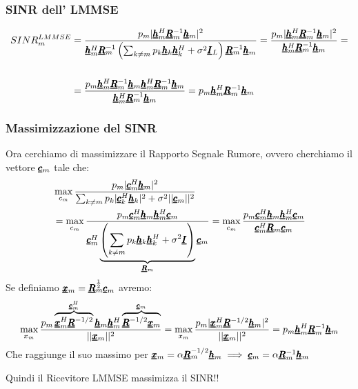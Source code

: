 \subsubsection{SINR dell' LMMSE}
\begin{equation*}
\begin{aligned}
     SINR_m^{LMMSE} &= \frac{p_m |\vc{h}_m^H \vc{R}_m^{-1} \vc{h}_m|^2}{\vc{h}_m^H \vc{R}_m^{-1} \left(\sum_{k \neq m} p_k \vc{h}_k \vc{h}_k^H + \sigma^2 \vc{I}_L \right)\vc{R}_m^{-1} \vc{h}_m } = \frac{p_m |\vc{h}_m^H \vc{R}_m^{-1} \vc{h}_m|^2}{\vc{h}_m^H \vc{R}_m^{-1} \vc{h}_m} = \\ \\
     &= \frac{p_m \vc{h}_m^H \vc{R}_m^{-1} \vc{h}_m \vc{h}_m^H \vc{R}_m^{-1} \vc{h}_m}{\vc{h}_m^H \vc{R}_m^{-1} \vc{h}_m} = p_m \vc{h}_m^H \vc{R}_m^{-1} \vc{h}_m 
\end{aligned}
\end{equation*}


\subsubsection{Massimizzazione del SINR}
Ora cerchiamo di massimizzare il Rapporto Segnale Rumore, ovvero cherchiamo il vettore $\vc{c}_m$ tale che:
\begin{equation*}
\begin{aligned}
    &\max_{c_m} \frac{p_m |\vc{c}_m^H \vc{h}_m|^2}{\sum_{k \neq m} p_k |\vc{c}_k^H \vc{h}_k|^2 +\sigma^2 ||\vc{c}_m||^2} \\
    &= \max_{c_m} \frac{p_m \vc{c}_m^H \vc{h}_m \vc{h}_m^H \vc{c}_m}{\vc{c}_m^H \underbrace{\left(\sum_{k \neq m} p_k \vc{h}_k \vc{h}_k^H  +\sigma^2 \vc{I}\right)}_{\vc{R}_m}\vc{c}_m} = \max_{c_m} \frac{p_m \vc{c}_m^H \vc{h}_m \vc{h}_m^H \vc{c}_m}{\vc{c}_m^H \vc{R}_m \vc{c}_m}
\end{aligned}
\end{equation*}
Se definiamo $\vc{x}_m = \vc{R}_m^{\frac{1}{2}} \vc{c}_m$ avremo:
\begin{equation*}
    \max_{x_m} \frac{p_m \overbrace{\vc{x}_m^H\vc{R}^{-1/2}}^{\vc{c}_m^H}\vc{h}_m \vc{h}_m^H  \overbrace{\vc{R}^{-1/2} \vc{x}_m}^{\vc{c}_m}}{||\vc{x}_m||^2} = \max_{x_m} \frac{p_m |\vc{x}_m^H\vc{R}^{-1/2} \vc{h}_m|^2 }{||\vc{x}_m||^2} = p_m \vc{h}_m^H \vc{R}_m^{-1} \vc{h}_m
\end{equation*}
Che raggiunge il suo massimo per $\vc{x}_m = \alpha \vc{R}_m^{-1/2}\vc{h}_m \implies \vc{c}_m = \alpha \vc{R}_m^{-1}\vc{h}_m$
\begin{center}
    Quindi il Ricevitore LMMSE massimizza il SINR!!
\end{center}


